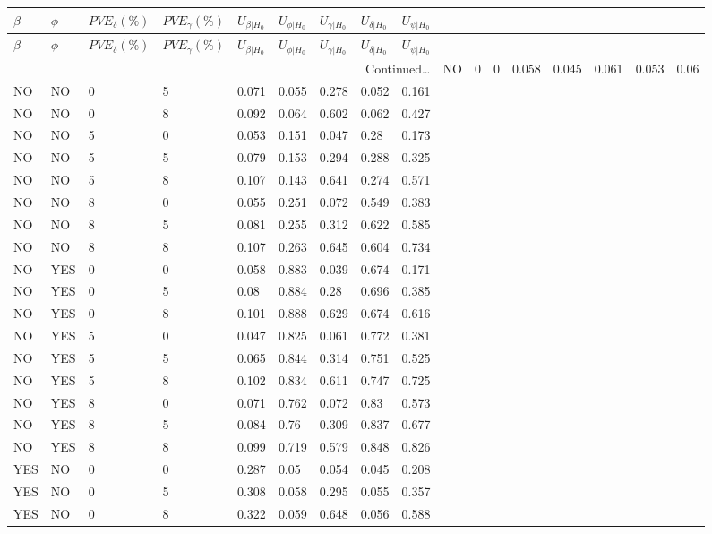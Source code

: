 \documentclass[hidelinks]{article}
\begin{document}
\begin{longtable}{lllllllll}
\hline
$\beta$ & $\phi$  & $PVE_\delta (\%)$  & $PVE_\gamma (\%)$  &  $U_{\beta|H_0}$ & $U_{\phi|H_0}$ & $U_{\gamma|H_0}$ & $U_{\delta|H_0}$ & $U_{\psi|H_0}$ \\ \hline
\endfirsthead
$\beta$ & $\phi$  & $PVE_\delta (\%)$  & $PVE_\gamma (\%)$  &  $U_{\beta|H_0}$ & $U_{\phi|H_0}$ & $U_{\gamma|H_0}$ & $U_{\delta|H_0}$ & $U_{\psi|H_0}$ \\ \hline
\endhead
\multicolumn{9}{r}{{Continued\ldots}} \
\endfoot
\hline
\endlastfoot
NO & NO & 0 & 0 & 0.058 & 0.045 & 0.061 & 0.053 & 0.06 \\
NO & NO & 0 & 5 & 0.071 & 0.055 & 0.278 & 0.052 & 0.161 \\
NO & NO & 0 & 8 & 0.092 & 0.064 & 0.602 & 0.062 & 0.427 \\
NO & NO & 5 & 0 & 0.053 & 0.151 & 0.047 & 0.28 & 0.173 \\
NO & NO & 5 & 5 & 0.079 & 0.153 & 0.294 & 0.288 & 0.325 \\
NO & NO & 5 & 8 & 0.107 & 0.143 & 0.641 & 0.274 & 0.571 \\
NO & NO & 8 & 0 & 0.055 & 0.251 & 0.072 & 0.549 & 0.383 \\
NO & NO & 8 & 5 & 0.081 & 0.255 & 0.312 & 0.622 & 0.585 \\
NO & NO & 8 & 8 & 0.107 & 0.263 & 0.645 & 0.604 & 0.734 \\	\hdashline
NO & YES & 0 & 0 & 0.058 & 0.883 & 0.039 & 0.674 & 0.171 \\
NO & YES & 0 & 5 & 0.08 & 0.884 & 0.28 & 0.696 & 0.385 \\
NO & YES & 0 & 8 & 0.101 & 0.888 & 0.629 & 0.674 & 0.616 \\
NO & YES & 5 & 0 & 0.047 & 0.825 & 0.061 & 0.772 & 0.381 \\
NO & YES & 5 & 5 & 0.065 & 0.844 & 0.314 & 0.751 & 0.525 \\
NO & YES & 5 & 8 & 0.102 & 0.834 & 0.611 & 0.747 & 0.725 \\
NO & YES & 8 & 0 & 0.071 & 0.762 & 0.072 & 0.83 & 0.573 \\
NO & YES & 8 & 5 & 0.084 & 0.76 & 0.309 & 0.837 & 0.677 \\
NO & YES & 8 & 8 & 0.099 & 0.719 & 0.579 & 0.848 & 0.826 \\ \hline
YES & NO & 0 & 0 & 0.287 & 0.05 & 0.054 & 0.045 & 0.208 \\
YES & NO & 0 & 5 & 0.308 & 0.058 & 0.295 & 0.055 & 0.357 \\
YES & NO & 0 & 8 & 0.322 & 0.059 & 0.648 & 0.056 & 0.588 \\

\end{longtable}
\end{document}
